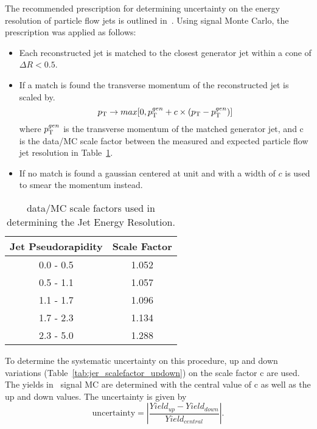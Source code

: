 The recommended prescription for determining uncertainty on the energy resolution of particle flow jets is outlined in~\cite{jer_ref}. Using signal Monte Carlo, the prescription was applied as follows:
\begin{itemize}
\item Each reconstructed jet is matched to the closest generator jet within a cone of $\Delta R < 0.5$.
\item If a match is found the transverse momentum of the reconstructed jet is scaled by.
\begin{equation}
p_{\mathrm{T}} \rightarrow max[0, p_{\mathrm{T}} ^{gen} + c \times (p_{\mathrm{T}} - p_{\mathrm{T}} ^{gen})]
\end{equation}
where $p_{\mathrm{T}} ^{gen}$ is the transverse momentum of the matched generator jet, and c is the data/MC scale factor between the measured and expected particle flow jet resolution in Table~\ref{tab:jer_scalefactor}.
\item If no match is found a gaussian centered at unit and with a width of $c$ is used to smear the momentum instead.
\end{itemize}

\begin{table}[h]
\begin{center}
\caption{\small \label{tab:jer_scalefactor} data/MC scale factors used in determining the Jet Energy Resolution.}
\begin{tabular}{c|c}\hline
Jet Pseudorapidity & Scale Factor \\ \hline \hline
0.0 - 0.5 & 1.052 \\
0.5 - 1.1 & 1.057 \\
1.1 - 1.7 & 1.096 \\
1.7 - 2.3 & 1.134 \\
2.3 - 5.0 & 1.288 \\
\hline
\hline
\end{tabular}
\end{center}
\end{table}

To determine the systematic uncertainty on this procedure, up and down variations (Table~\ref{tab:jer_scalefactor_updown}) on the scale factor c are used. The yields in \ttZ \ signal MC are determined with the central value of c as well as the up and down values. The uncertainty is given by
\begin{equation}
\mathrm{uncertainty} = | \frac{Yield _{up} - Yield _{down}}{Yield _{central}} |.
\end{equation}

